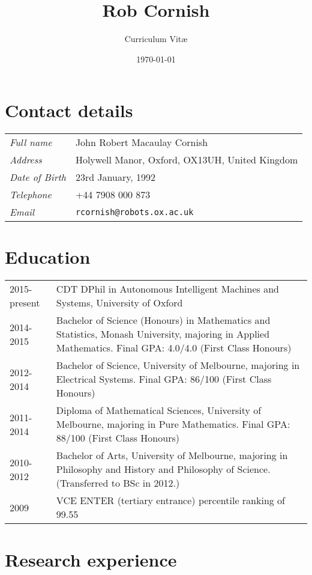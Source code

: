 \documentclass[12pt,a4paper]{article}
\title{\bfseries \huge Rob Cornish}
\author{Curriculum Vit\ae}
\date{\today}
\newcommand{\mailto}[1]{\texttt{#1}}
\newenvironment{llist}
  {\renewcommand{\arraystretch}{1.5}\begin{longtable}{p{3.5cm} p{12cm}}}
  {\end{longtable}}
\begin{document}
\maketitle
{}


\thispagestyle{empty}

\section*{Contact details}
\begin{llist}
  \textit{Full name} & John Robert Macaulay Cornish \\
  \textit{Address} & Holywell Manor, Oxford, OX13UH, United Kingdom\\
  \textit{Date of Birth} & 23rd January, 1992 \\
  \textit{Telephone} & +44 7908 000 873 \\
  \textit{Email} & \mailto{rcornish@robots.ox.ac.uk}
\end{llist}

\section*{Education}

\begin{llist}
  2015-present & CDT DPhil in Autonomous Intelligent Machines and Systems, University of Oxford \\
  2014-2015 & Bachelor of Science (Honours) in Mathematics and Statistics, Monash University,
  majoring in Applied Mathematics. Final GPA: 4.0/4.0 (First Class Honours) \\ 
  2012-2014 & Bachelor of Science, University of Melbourne, majoring in
  Electrical Systems. Final GPA: 86/100 (First Class Honours) \\
  2011-2014 & Diploma of Mathematical Sciences, University of Melbourne,
  majoring in Pure Mathematics. Final GPA: 88/100 (First Class Honours) \\
  2010-2012 & Bachelor of Arts, University of Melbourne, majoring in Philosophy
  and History and Philosophy of Science. (Transferred to BSc in 2012.) \\
  2009 & VCE ENTER (tertiary entrance) percentile ranking of 99.55
\end{llist}

\section*{Research experience}
\end{document}
